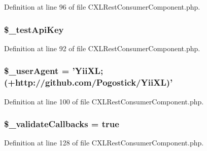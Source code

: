 Definition at line 96 of file CXLRestConsumerComponent.php.

\hypertarget{classCXLRestConsumerComponent_a539fd69c22d2f9c368e410d3542cd5a6}{
\subsubsection[{\$\_\-testApiKey}]{\setlength{\rightskip}{0pt plus 5cm}\$\_\-testApiKey}}
\label{classCXLRestConsumerComponent_a539fd69c22d2f9c368e410d3542cd5a6}


Definition at line 92 of file CXLRestConsumerComponent.php.

\hypertarget{classCXLRestConsumerComponent_a901ed68c5b7f6b758cc90b00197ca88b}{
\subsubsection[{\$\_\-userAgent}]{\setlength{\rightskip}{0pt plus 5cm}\$\_\-userAgent = '{\bf YiiXL}; (+http://github.com/Pogostick/{\bf YiiXL})'}}
\label{classCXLRestConsumerComponent_a901ed68c5b7f6b758cc90b00197ca88b}


Definition at line 100 of file CXLRestConsumerComponent.php.

\hypertarget{classCXLRestConsumerComponent_a73fdad41769f4f4ef1ebeaba5380ffad}{
\subsubsection[{\$\_\-validateCallbacks}]{\setlength{\rightskip}{0pt plus 5cm}\$\_\-validateCallbacks = true}}
\label{classCXLRestConsumerComponent_a73fdad41769f4f4ef1ebeaba5380ffad}


Definition at line 128 of file CXLRestConsumerComponent.php.

